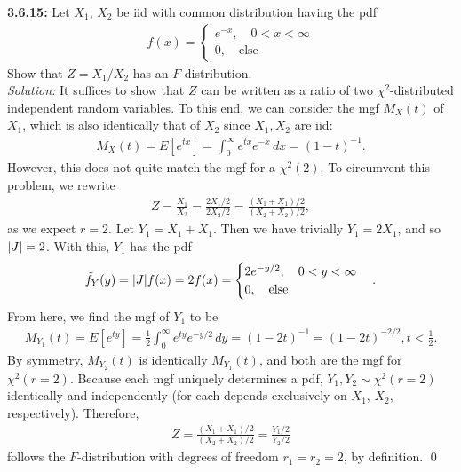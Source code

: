 \documentclass{book}
\theoremstyle{definition}
\newcommand{\Else}{\text{else}}
\newcommand{\f}[2]{\frac{#1}{#2}}
\begin{document}
\newpage

\noindent\textbf{3.6.15:} Let $X_1$, $X_2$ be iid with common distribution having the pdf 
\begin{align}
f(x) = \begin{cases}
e^{-x}, \quad 0< x < \infty\\
0, \quad \text{else}
\end{cases}
\end{align}
Show that $Z = X_1/X_2$ has an $F$-distribution.\\

\noindent \textit{Solution:}  It suffices to show that $Z$ can be written as a ratio of two $\chi^2$-distributed independent random variables. To this end, we can consider the mgf $M_X(t)$ of $X_1$, which is also identically that of $X_2$ since $X_1, X_2$ are iid:
\begin{align}
M_X(t) = E[e^{tx}] = \int^\infty_0 e^{tx}e^{-x} \,dx = (1-t)^{-1}.
\end{align}
However, this does not quite match the mgf for a $\chi^2(2)$. To circumvent this problem, we rewrite
\begin{align}
Z = \f{X_1}{X_2} =\f{2X_1/2}{2X_2/2}  = \f{(X_1+X_1)/2}{(X_2+X_2)/2},
\end{align}
as we expect $r=2$. Let $Y_1 = X_1 + X_1$. Then we have trivially $Y_1 =2X_1$, and so $\abs{J} = 2$. With this, $Y_1$ has the pdf 
\begin{align}
\tilde{f}_Y(y) = \abs{J}f(x) = 2f(x) = \begin{cases}
2e^{-y/2}, \quad 0 < y < \infty\\
0, \quad \Else
\end{cases}. 
\end{align}
From here, we find the mgf of $Y_1$ to be 
\begin{align}
M_{Y_1}(t) = E[e^{ty}] = \f{1}{2}\int^\infty_{0}e^{ty}e^{-y/2}\,dy = (1-2t)^{-1} = (1-2t)^{-2/2}, t < \f{1}{2}.
\end{align}
By symmetry, $M_{Y_2}(t)$ is identically $M_{Y_1}(t)$, and both are the mgf for $\chi^2(r=2)$. Because each mgf uniquely determines a pdf, $Y_1, Y_2 \sim \chi^2(r=2)$ identically and independently (for each depends exclusively on $X_1$, $X_2$, respectively). Therefore, 
\begin{align}
Z = \f{(X_1+X_1)/2}{(X_2+X_2)/2} = \f{Y_1/2}{Y_2/2}
\end{align}
follows the $F$-distribution with degrees of freedom $r_1 = r_2 = 2$, by definition. \qed
\end{document}

